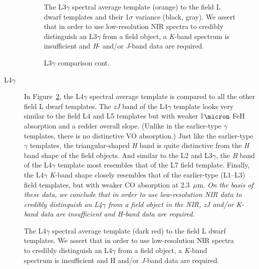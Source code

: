\documentclass[12pt]{aastex6}
\begin{document}
\begin{description}
\begin{figure}[b]
  \caption{The L3$\gamma$ spectral average template (orange) to the field L dwarf templates and their 1$\sigma$ variance (black, gray).
  We assert that in order to use low-resolution NIR spectra to credibly distinguish an L3$\gamma$ from a field object, a \emph{K}-band spectrum is insufficient and \emph{H}- and/or \emph{J}-band data are required.}
  \label{fig:L3lg-field}
\end{figure}

\begin{figure}
     \caption{L3$\gamma$ comparison cont.}
\end{figure}
\clearpage

\item[L4$\gamma$]{
In Figure~\ref{fig:L4lg-field}, the L4$\gamma$ spectral average template is compared to all the other field L dwarf templates.
The \emph{zJ} band of the L4$\gamma$ template looks very similar to the field L4 and L5 templates but with weaker 1$\micron$ FeH absorption and a redder overall slope. (Unlike in the earlier-type $\gamma$ templates, there is no distinctive VO absorption.)
Just like the earlier-type $\gamma$ templates, the triangular-shaped \emph{H} band is quite distinctive from the \emph{H} band shape of the field objects. And similar to the L2 and L3$\gamma$, the \emph{H} band of the L4$\gamma$ template most resembles that of the L7 field template.
Finally, the L4$\gamma$ \emph{K}-band shape closely resembles that of the earlier-type (L1--L3) field templates, but with weaker CO absorption at 2.3~$\mu$m.
\emph{On the basis of these data, we conclude that in order to use low-resolution NIR data to credibly distinguish an L4$\gamma$ from a field object in the NIR, \emph{zJ} and/or \emph{K}-band data are insufficient and \emph{H}-band data are required.}
}
\end{description}

\begin{figure}[b]
    \caption{The L4$\gamma$ spectral average template (dark red) to the field L dwarf templates.
    We assert that in order to use low-resolution NIR spectra to credibly distinguish an L4$\gamma$ from a field object, a \emph{K}-band spectrum is insufficient and H and/or \emph{J}-band data are required.}
    \label{fig:L4lg-field}
\end{figure}
\end{document}
